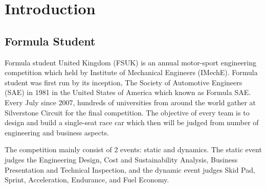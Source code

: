 \justifying
\noindent

\section{Introduction}
\subsection{Formula Student}
Formula student United Kingdom (FSUK) is an annual motor-sport engineering competition which held by Institute of Mechanical Engineers (IMechE). Formula student was first run by its inception, The Society of Automotive Engineers (SAE) in 1981 in the United States of America which known as Formula SAE. Every July since 2007, hundreds of universities from around the world gather at Silverstone Circuit for the final competition. The objective of every team is to design and build a single-seat race car which then will be judged from number of engineering and business aspects.

The competition mainly consist of 2 events: static and dynamics. The static event judges the Engineering  Design,  Cost  and  Sustainability  Analysis, Business Presentation and Technical Inspection, and the dynamic event judges Skid Pad, Sprint, Acceleration, Endurance, and Fuel Economy.


